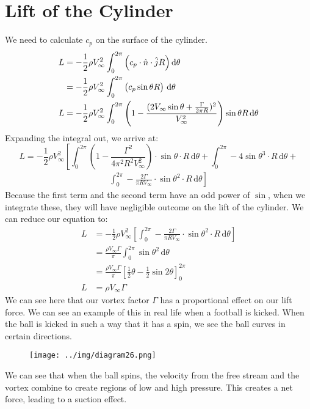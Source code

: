 \documentclass[class=report, crop=false, 12pt,a4paper]{standalone}
\begin{document}
\section{Lift of the Cylinder}
We need to calculate $c_p$ on the surface of the cylinder.
\begin{align}
  L &= -\frac{1}{2}\rho V_{\infty}^2\int_{0}^{2\pi} \left(c_p \cdot \hat{n}\cdot\hat{j}R\right)\dif \theta \\
  &= - \frac{1}{2}\rho V_{\infty}^2 \int_{0}^{2\pi} \left(c_p \sin\theta R\right) \,\mathrm{d}\theta \\
  L &= -\frac{1}{2}\rho V_{\infty}^2 \int_{0}^{2\pi} \left(1-\frac{(2V_{\infty}\sin\theta + \frac{\Gamma}{2\pi R})^2}{V_{\infty}^2}\right) \sin\theta R \,\mathrm{d}\theta 
\end{align}
Expanding the integral out, we arrive at:
$$
  L = -\frac{1}{2} \rho V_\infty^2 \left[ \int_{0}^{2\pi} \left(1 - \frac{\Gamma^2}{4\pi^2R^2V_\infty^2}\right)\cdot \sin{\theta} \cdot R \,\mathrm{d}\theta + \int_{0}^{2\pi} -4\sin{\theta}^3 \cdot R \,\mathrm{d}\theta + \right.
$$
\begin{align}
  \left. \int_{0}^{2\pi} -\frac{2\Gamma}{\pi RV_\infty}\cdot \sin{\theta}^2 \cdot R \,\mathrm{d}\theta \right]
\end{align}
Because the first term and the second term have an odd power of $\sin{}$, when we integrate these, they will have negligible outcome on the lift of the cylinder. We can reduce our equation to:
\begin{align}
  L &= -\frac{1}{2} \rho V_\infty^2 \left[ \int_{0}^{2\pi} -\frac{2\Gamma}{\pi RV_\infty}\cdot \sin{\theta}^2 \cdot R \,\mathrm{d}\theta \right]\\
  &= \frac{\rho V_\infty \Gamma}{\pi} \int_{0}^{2\pi} \sin{\theta}^2 \,\mathrm{d}\theta \\
  &= \frac{\rho V_\infty \Gamma}{\pi} \left[ \frac{1}{2}\theta - \frac{1}{2}\sin{2\theta} \right]_0^{2\pi}\\
  L &= \rho V_\infty \Gamma 
\end{align}
We can see here that our vortex factor $\Gamma$ has a proportional effect on our lift force. We can see an example of this in real life when a football is kicked. When the ball is kicked in such a way that it has a spin, we see the ball curves in certain directions.
\begin{figure}[H]
  \centering
  \texttt{[image: ../img/diagram26.png]}
\end{figure}
We can see that when the ball spins, the velocity from the free stream and the vortex combine to create regions of low and high pressure. This creates a net force, leading to a suction effect.
\end{document}
